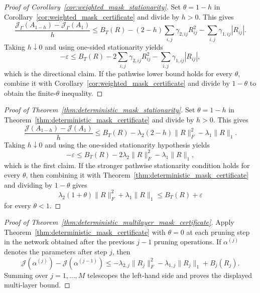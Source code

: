 \documentclass[11pt]{article}
\theoremstyle{plain}
\theoremstyle{definition}
\theoremstyle{remark}
\newcommand{\1}{\mathbf{1}}
\begin{document}
\begin{proof}[Proof of Corollary~\ref{cor:weighted_mask_stationarity}]
Set \(\theta=1-h\) in Corollary~\ref{cor:weighted_mask_certificate} and divide by \(h>0\). This gives
\[
\frac{\mathcal J_{\Gamma}(A_{1-h})-\mathcal J_{\Gamma}(A_1)}{h}
\le
B_T(R)
-(2-h)\sum_{i,j}\gamma_{2,ij}R_{ij}^2
-\sum_{i,j}\gamma_{1,ij}|R_{ij}|.
\]
Taking \(h\downarrow0\) and using one-sided stationarity yields
\[
-\varepsilon
\le
B_T(R)
-2\sum_{i,j}\gamma_{2,ij}R_{ij}^2
-\sum_{i,j}\gamma_{1,ij}|R_{ij}|,
\]
which is the directional claim. If the pathwise lower bound holds for every \(\theta\), combine it with Corollary~\ref{cor:weighted_mask_certificate} and divide by \(1-\theta\) to obtain the finite-\(\theta\) inequality.
\end{proof}

\begin{proof}[Proof of Theorem~\ref{thm:deterministic_mask_stationarity}]
Set \(\theta=1-h\) in Theorem~\ref{thm:deterministic_mask_certificate} and divide by \(h>0\). This gives
\[
\frac{\mathcal J(A_{1-h})-\mathcal J(A_1)}{h}
\le
B_T(R)-\lambda_2(2-h)\|R\|_F^2-\lambda_1\|R\|_1.
\]
Taking \(h\downarrow0\) and using the one-sided stationarity hypothesis yields
\[
-\varepsilon
\le
B_T(R)-2\lambda_2\|R\|_F^2-\lambda_1\|R\|_1,
\]
which is the first claim. If the stronger pathwise stationarity condition holds for every \(\theta\), then combining it with Theorem~\ref{thm:deterministic_mask_certificate} and dividing by \(1-\theta\) gives
\[
\lambda_2(1+\theta)\|R\|_F^2+\lambda_1\|R\|_1
\le
B_T(R)+\varepsilon
\]
for every \(\theta<1\).
\end{proof}

\begin{proof}[Proof of Theorem~\ref{thm:deterministic_multilayer_mask_certificate}]
Apply Theorem~\ref{thm:deterministic_mask_certificate} with \(\theta=0\) at each pruning step in the network obtained after the previous \(j-1\) pruning operations. If \(\alpha^{(j)}\) denotes the parameters after step \(j\), then
\[
\mathcal J(\alpha^{(j)})-\mathcal J(\alpha^{(j-1)})
\le
-\lambda_{2,j}\|R_j\|_F^2
-\lambda_{1,j}\|R_j\|_1
+B_j(R_j).
\]
Summing over \(j=1,\dots,M\) telescopes the left-hand side and proves the displayed multi-layer bound.
\end{proof}
\end{document}
